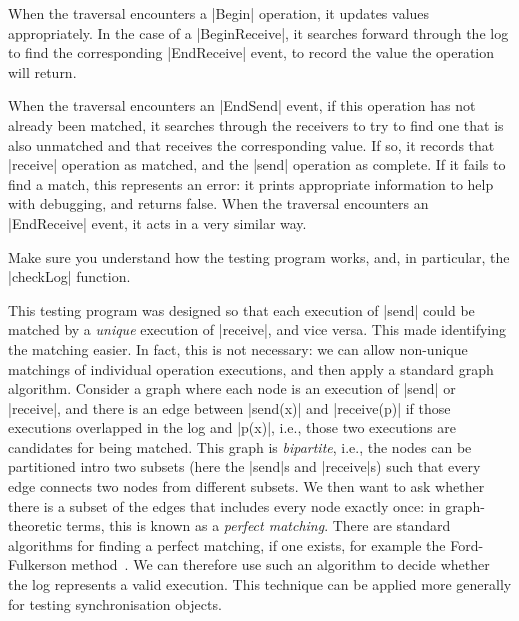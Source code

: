 When the traversal encounters a |Begin| operation, it updates values
appropriately.  In the case of a |BeginReceive|, it searches forward through
the log to find the corresponding |EndReceive| event, to record the value the
operation will return.

When the traversal encounters an |EndSend| event, if this operation has not
already been matched, it searches through the receivers to try to find one
that is also unmatched and that receives the corresponding value.  If so, it
records that |receive| operation as matched, and the |send| operation as
complete.  If it fails to find a match, this represents an error: it prints
appropriate information to help with debugging, and returns false.  When the
traversal encounters an |EndReceive| event, it acts in a very similar way.

\begin{instruction}
Make sure you understand how the testing program works, and, in particular,
the |checkLog| function.
\end{instruction}

This testing program was designed so that each execution of |send| could be
matched by a \emph{unique} execution of |receive|, and vice versa.  This made
identifying the matching easier.  In fact, this is not necessary: we can allow
non-unique matchings of individual operation executions, and then apply a
standard graph algorithm.  Consider a graph where each node is an execution of
|send| or |receive|, and there is an edge between |send(x)| and |receive(p)|
if those executions overlapped in the log and |p(x)|, i.e., those two
executions are candidates for being matched.  This graph is \emph{bipartite},
i.e., the nodes can be partitioned intro two subsets (here the |send|s and
|receive|s) such that every edge connects two nodes from different subsets.
We then want to ask whether there is a subset of the edges that includes every
node exactly once: in graph-theoretic terms, this is known as a \emph{perfect
  matching}.  There are standard algorithms for finding a perfect matching, if
one exists, for example the Ford-Fulkerson method~\cite{ford-fulkerson}.  We
can therefore use such an algorithm to decide whether the log represents a
valid execution.  This technique can be applied more generally for testing
synchronisation objects.


